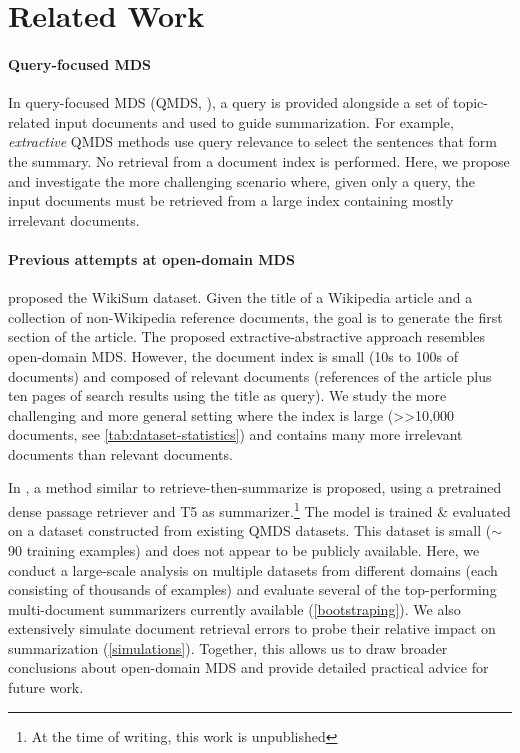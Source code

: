 \documentclass[11pt]{article}
\begin{document}
\vspace{-1.0mm}
\section{Related Work}
\label{related-work}
\vspace{-1.0mm}

\paragraph{Query-focused MDS} In query-focused MDS (QMDS, \citealp{wang-etal-2013-sentence, Feigenblat2017UnsupervisedQM, xu-lapata-2020-coarse, Pasunuru2021DataAF}), a query is provided alongside a set of topic-related input documents and used to guide summarization. For example, \textit{extractive} QMDS methods use query relevance to select the sentences that form the summary. No retrieval from a document index is performed. Here, we propose and investigate the more challenging scenario where, given only a query, the input documents must be retrieved from a large index containing mostly irrelevant documents.

\paragraph{Previous attempts at open-domain MDS} \citet{Liu2018GeneratingWB} proposed the WikiSum dataset. Given the title of a Wikipedia article and a collection of non-Wikipedia reference documents, the goal is to generate the first section of the article. The proposed extractive-abstractive approach resembles open-domain MDS. However, the document index is small (10s to 100s of documents) and composed of relevant documents (references of the article plus ten pages of search results using the title as query). We study the more challenging and more general setting where the index is large (>>10,000 documents, see \autoref{tab:dataset-statistics}) and contains many more irrelevant documents than relevant documents.

In \citet{DBLP:journals/corr/abs-2112-07536}, a method similar to retrieve-then-summarize is proposed, using a pretrained dense passage retriever \citep{karpukhin-etal-2020-dense} and T5 \citep{JMLR:v21:20-074} as summarizer.\footnote{At the time of writing, this work is unpublished} The model is trained \& evaluated on a dataset constructed from existing QMDS datasets. This dataset is small (\(\sim\)90 training examples) and does not appear to be publicly available. Here, we conduct a large-scale analysis on multiple datasets from different domains (each consisting of thousands of examples) and evaluate several of the top-performing multi-document summarizers currently available (\textsection \ref{bootstraping}). We also extensively simulate document retrieval errors to probe their relative impact on summarization (\textsection \ref{simulations}). Together, this allows us to draw broader conclusions about open-domain MDS and provide detailed practical advice for future work.
\end{document}
